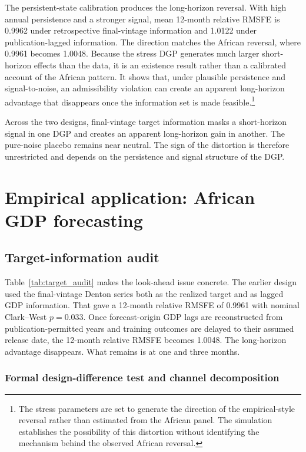 \documentclass[preprint,12pt,authoryear]{elsarticle}
\begin{document}
The persistent-state calibration produces the long-horizon reversal. With
high annual persistence and a stronger signal, mean 12-month relative RMSFE is
0.9962 under retrospective final-vintage information and 1.0122 under
publication-lagged information. The direction matches the African reversal,
where 0.9961 becomes 1.0048. Because the stress DGP generates much larger
short-horizon effects than the data, it is an existence result rather than a
calibrated account of the African pattern. It shows that, under plausible
persistence and signal-to-noise, an admissibility violation can create an
apparent long-horizon advantage that disappears once the information set is
made feasible.\footnote{The stress parameters are set to generate the direction
of the empirical-style reversal rather than estimated from the African panel.
The simulation establishes the possibility of this distortion without
identifying the mechanism behind the observed African reversal.}

Across the two designs, final-vintage target information masks a short-horizon
signal in one DGP and creates an apparent long-horizon gain in another. The
pure-noise placebo remains near neutral. The sign of the distortion is therefore
unrestricted and depends on the persistence and signal structure of the DGP.

\section{Empirical application: African GDP forecasting}

\subsection{Target-information audit}

Table~\ref{tab:target_audit} makes the look-ahead issue concrete. The earlier
design used the final-vintage Denton series both as the realized target and as
lagged GDP information. That gave a 12-month relative RMSFE of 0.9961 with
nominal Clark--West $p = 0.033$. Once forecast-origin GDP lags are
reconstructed from publication-permitted years and training outcomes are
delayed to their assumed release date, the 12-month relative RMSFE becomes
1.0048. The long-horizon advantage disappears. What remains is at one and
three months.



\subsubsection{Formal design-difference test and channel decomposition}
\end{document}

